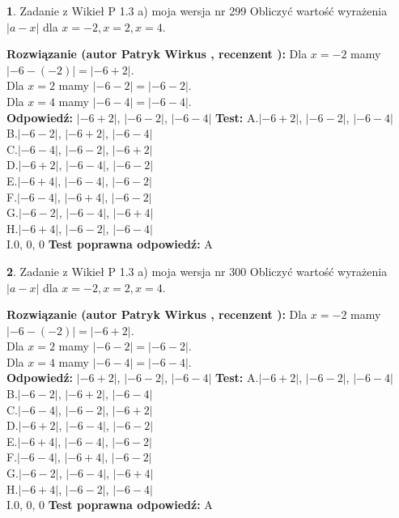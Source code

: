 \documentclass[12pt, a4paper]{article}
\theoremstyle{definition} %
\newtheorem{zad}{}
\newcommand{\zadStart}[1]{\begin{zad}#1\newline}
\newcommand{\zadStop}{\end{zad}}
\newcommand{\rozwStart}[2]{\noindent \textbf{Rozwiązanie (autor #1 , recenzent #2): }\newline}
\newcommand{\rozwStop}{\newline}
\newcommand{\odpStart}{\noindent \textbf{Odpowiedź:}\newline}
\newcommand{\odpStop}{\newline}
\newcommand{\testStart}{\noindent \textbf{Test:}\newline}
\newcommand{\testStop}{\newline}
\newcommand{\kluczStart}{\noindent \textbf{Test poprawna odpowiedź:}\newline}
\newcommand{\kluczStop}{\newline}
\begin{document}
\zadStart{Zadanie z Wikieł P 1.3 a) moja wersja nr 299}
Obliczyć wartość wyrażenia $|a - x|$ dla $x=-2,x=2,x=4$.
\zadStop
\rozwStart{Patryk Wirkus}{}
Dla $x = -2$ mamy $|-6 - (-2)| = |-6 + 2|$.\\
Dla $x = 2$ mamy $|-6 - 2| = |-6 - 2|$.\\
Dla $x = 4$ mamy $|-6 - 4| = |-6 - 4|$.\\
\rozwStop
\odpStart
$|-6 + 2|$, $|-6 - 2|$, $|-6 - 4|$
\odpStop
\testStart
A.$|-6 + 2|$, $|-6 - 2|$, $|-6 - 4|$\\
B.$|-6 - 2|$, $|-6 + 2|$, $|-6 - 4|$\\
C.$|-6 - 4|$, $|-6 - 2|$, $|-6 + 2|$\\
D.$|-6 + 2|$, $|-6 - 4|$, $|-6 - 2|$\\
E.$|-6 + 4|$, $|-6 - 4|$, $|-6 - 2|$\\
F.$|-6 - 4|$, $|-6 + 4|$, $|-6 - 2|$\\
G.$|-6 - 2|$, $|-6 - 4|$, $|-6 + 4|$\\
H.$|-6 + 4|$, $|-6 - 2|$, $|-6 - 4|$\\
I.$0$, $0$, $0$
\testStop
\kluczStart
A
\kluczStop



\zadStart{Zadanie z Wikieł P 1.3 a) moja wersja nr 300}
Obliczyć wartość wyrażenia $|a - x|$ dla $x=-2,x=2,x=4$.
\zadStop
\rozwStart{Patryk Wirkus}{}
Dla $x = -2$ mamy $|-6 - (-2)| = |-6 + 2|$.\\
Dla $x = 2$ mamy $|-6 - 2| = |-6 - 2|$.\\
Dla $x = 4$ mamy $|-6 - 4| = |-6 - 4|$.\\
\rozwStop
\odpStart
$|-6 + 2|$, $|-6 - 2|$, $|-6 - 4|$
\odpStop
\testStart
A.$|-6 + 2|$, $|-6 - 2|$, $|-6 - 4|$\\
B.$|-6 - 2|$, $|-6 + 2|$, $|-6 - 4|$\\
C.$|-6 - 4|$, $|-6 - 2|$, $|-6 + 2|$\\
D.$|-6 + 2|$, $|-6 - 4|$, $|-6 - 2|$\\
E.$|-6 + 4|$, $|-6 - 4|$, $|-6 - 2|$\\
F.$|-6 - 4|$, $|-6 + 4|$, $|-6 - 2|$\\
G.$|-6 - 2|$, $|-6 - 4|$, $|-6 + 4|$\\
H.$|-6 + 4|$, $|-6 - 2|$, $|-6 - 4|$\\
I.$0$, $0$, $0$
\testStop
\kluczStart
A
\kluczStop
\end{document}
